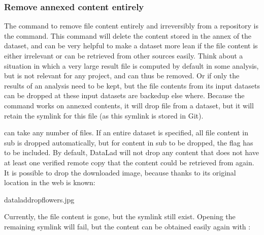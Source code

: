 \subsubsection{Remove annexed content entirely}
\label{\detokenize{basics/101-136-filesystem:remove-annexed-content-entirely}}\label{\detokenize{basics/101-136-filesystem:remove}}\label{\detokenize{basics/101-136-filesystem:index-16}}
\sphinxAtStartPar
The command to remove file content entirely and irreversibly from a repository is
the  command.
This command will delete the content stored in the annex of the dataset,
and can be very helpful to make a dataset more lean if the file content is
either irrelevant or can be retrieved from other sources easily. Think about a
situation in which a very large result file is computed by default
in some analysis, but is not relevant for any project, and can thus be removed.
Or if only the results of an analysis need to be kept, but the file contents from
its input datasets can be dropped at these input datasets are backed\sphinxhyphen{}up else
where. Because the command works on annexed contents, it will drop file 
from a dataset, but it will retain the symlink for this file (as this symlink
is stored in Git).

\sphinxAtStartPar
{} can take any number of files.
If an entire dataset is specified, all file content in sub\sphinxhyphen{} is
dropped automatically, but for content in sub\sphinxhyphen{} to be dropped, the
 flag has to be included.
By default, DataLad will not drop any content that does not have at least
one verified remote copy that the content could be retrieved from again.
It is possible to drop the downloaded image, because thanks to
 its original location in the web is known:

\begin{sphinxVerbatim}[commandchars=\\\{\}]
dataladdropflowers.jpg
\end{sphinxVerbatim}

\sphinxAtStartPar
Currently, the file content is gone, but the symlink still exist. Opening the
remaining symlink will fail, but the content can be obtained easily again with
:

